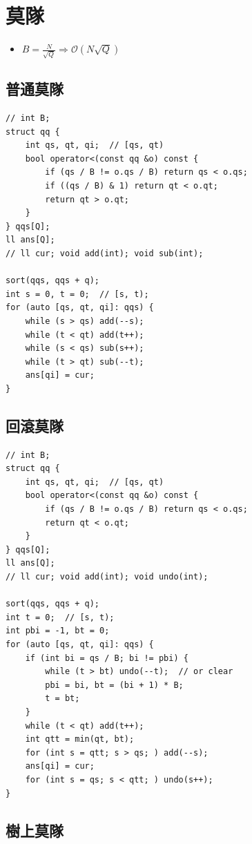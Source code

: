 \documentclass[10pt, a4paper, twocolumn]{article}
\begin{document}
\section{莫隊}

\begin{itemize}[tight_item]
    \item $B = \frac{N}{\sqrt{Q}} \Rightarrow \mathcal{O}(N \sqrt{Q})$
\end{itemize}

\subsection*{普通莫隊}

\begin{verbatim}
// int B;
struct qq {
    int qs, qt, qi;  // [qs, qt)
    bool operator<(const qq &o) const {
        if (qs / B != o.qs / B) return qs < o.qs;
        if ((qs / B) & 1) return qt < o.qt;
        return qt > o.qt;
    }
} qqs[Q];
ll ans[Q];
// ll cur; void add(int); void sub(int);

sort(qqs, qqs + q);
int s = 0, t = 0;  // [s, t);
for (auto [qs, qt, qi]: qqs) {
    while (s > qs) add(--s);
    while (t < qt) add(t++);
    while (s < qs) sub(s++);
    while (t > qt) sub(--t);
    ans[qi] = cur;
}
\end{verbatim}

\subsection*{回滾莫隊}

\begin{verbatim}
// int B;
struct qq {
    int qs, qt, qi;  // [qs, qt)
    bool operator<(const qq &o) const {
        if (qs / B != o.qs / B) return qs < o.qs;
        return qt < o.qt;
    }
} qqs[Q];
ll ans[Q];
// ll cur; void add(int); void undo(int);

sort(qqs, qqs + q);
int t = 0;  // [s, t);
int pbi = -1, bt = 0;
for (auto [qs, qt, qi]: qqs) {
    if (int bi = qs / B; bi != pbi) {
        while (t > bt) undo(--t);  // or clear
        pbi = bi, bt = (bi + 1) * B;
        t = bt;
    }
    while (t < qt) add(t++);
    int qtt = min(qt, bt);
    for (int s = qtt; s > qs; ) add(--s);
    ans[qi] = cur;
    for (int s = qs; s < qtt; ) undo(s++);
}
\end{verbatim}

\subsection*{樹上莫隊}
\end{document}

